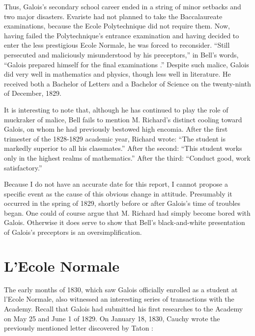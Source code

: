 \documentclass[12pt]{article}
\begin{document}
Thus, Galois's secondary school career ended in a string of minor setbacks and two major disasters. Evariste had not planned to take the Baccalaureate examinations, because the Ecole Polytechnique did not require them. Now, having failed the Polytechnique's entrance examination and having decided to enter the less prestigious Ecole Normale, he was forced to reconsider. ``Still persecuted and maliciously misunderstood by his preceptors,'' in Bell's words, ``Galois prepared himself for the final examinations \cite{31}.'' Despite such malice, Galois did very well in mathematics and physics, though less well in literature. He received both a Bachelor of Letters and a Bachelor of Science on the twenty-ninth of December, 1829.

It is interesting to note that, although he has continued to play the role of muckraker of malice, Bell fails to mention M. Richard's distinct cooling toward Galois, on whom he had previously bestowed high encomia. After the first trimester of the 1828-1829 academic year, Richard wrote: ``The student is markedly superior to all his classmates.'' After the second: ``This student works only in the highest realms of mathematics.'' After the third: ``Conduct good, work satisfactory.''

Because I do not have an accurate date for this report, I cannot propose a specific event as the cause of this obvious change in attitude. Presumably it occurred in the spring of 1829, shortly before or after Galois's time of troubles began. One could of course argue that M. Richard had simply become bored with Galois. Otherwise it does serve to show that Bell's black-and-white presentation of Galois's preceptors is an oversimplification.

\section{L'Ecole Normale}

The early months of 1830, which saw Galois officially enrolled as a student at l'Ecole Normale, also witnessed an interesting series of transactions with the Academy. Recall that Galois had submitted his first researches to the Academy on May 25 and June 1 of 1829. On January 18, 1830, Cauchy wrote the previously mentioned letter discovered by Taton \cite{32}:
\end{document}
